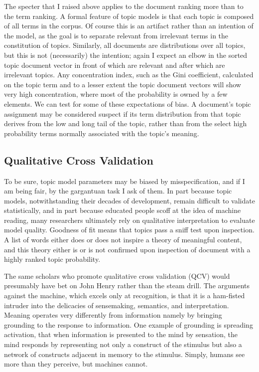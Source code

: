 \documentclass[]{book}
\theoremstyle{definition}
\theoremstyle{definition}
\theoremstyle{definition}
\theoremstyle{remark}
\begin{document}
The specter that I raised above applies to the document ranking more
than to the term ranking. A formal feature of topic models is that each
topic is composed of all terms in the corpus. Of course this is an
artifact rather than an intention of the model, as the goal is to
separate relevant from irrelevant terms in the constitution of topics.
Similarly, all documents are distributions over all topics, but this is
not (necessarily) the intention; again I expect an elbow in the sorted
topic document vector in front of which are relevant and after which are
irrelevant topics. Any concentration index, such as the Gini
coefficient, calculated on the topic term and to a lesser extent the
topic document vectors will show very high concentration, where most of
the probability is owned by a few elements. We can test for some of
these expectations of bias. A document's topic assignment may be
considered suspect if its term distribution from that topic derives from
the low and long tail of the topic, rather than from the select high
probability terms normally associated with the topic's meaning.

\hypertarget{qualitative-cross-validation}{%
\subsection{Qualitative Cross
Validation}\label{qualitative-cross-validation}}

To be sure, topic model parameters may be biased by misspecification,
and if I am being fair, by the gargantuan task I ask of them. In part
because topic models, notwithstanding their decades of development,
remain difficult to validate statistically, and in part because educated
people scoff at the idea of machine reading, many researchers ultimately
rely on qualitative interpretation to evaluate model quality. Goodness
of fit means that topics pass a sniff test upon inspection. A list of
words either does or does not inspire a theory of meaningful content,
and this theory either is or is not confirmed upon inspection of
document with a highly ranked topic probability.

The same scholars who promote qualitative cross validation (QCV) would
presumably have bet on John Henry rather than the steam drill. The
arguments against the machine, which excels only at recognition, is that
it is a ham-fisted intruder into the delicacies of sensemaking,
semantics, and interpretation. Meaning operates very differently from
information namely by bringing grounding to the response to information.
One example of grounding is spreading activation, that when information
is presented to the mind by sensation, the mind responds by representing
not only a construct of the stimulus but also a network of constructs
adjacent in memory to the stimulus. Simply, humans see more than they
perceive, but machines cannot.
\end{document}
